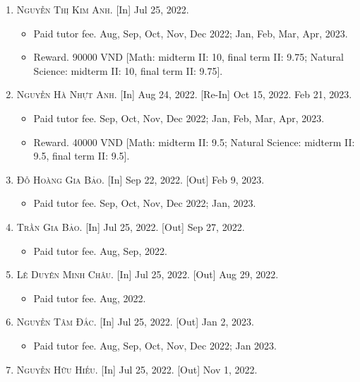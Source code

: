 \documentclass{article}
\begin{document}
\begin{enumerate}
	\item \textsc{Nguyễn Thị Kim Anh.} \textsf{[In]} Jul 25, 2022.
	\begin{itemize}
		\item \textsf{Paid tutor fee.} Aug, Sep, Oct, Nov, Dec 2022; Jan, Feb, Mar, Apr, 2023.
		\item \textsf{Reward.} 90000 VND [Math: midterm II: 10, final term II: 9.75; Natural Science: midterm II: 10, final term II: 9.75].
	\end{itemize}
	\item \textsc{Nguyễn Hà Nhựt Anh.} \textsf{[In]} Aug 24, 2022. \textsf{[Re-In]} Oct 15, 2022. Feb 21, 2023.
	\begin{itemize}
		\item \textsf{Paid tutor fee.} Sep, Oct, Nov, Dec 2022; Jan, Feb, Mar, Apr, 2023.
		\item \textsf{Reward.} 40000 VND [Math: midterm II: 9.5; Natural Science: midterm II: 9.5, final term II: 9.5].
	\end{itemize}
	\item \textsc{Đỗ Hoàng Gia Bảo.} \textsf{[In]} Sep 22, 2022. \textsf{[Out]} Feb 9, 2023.
	\begin{itemize}
		\item \textsf{Paid tutor fee.} Sep, Oct, Nov, Dec 2022; Jan, 2023.
	\end{itemize}
	\item \textsc{Trần Gia Bảo.} \textsf{[In]} Jul 25, 2022. \textsf{[Out]} Sep 27, 2022.
	\begin{itemize}
		\item \textsf{Paid tutor fee.} Aug, Sep, 2022.
	\end{itemize}
	\item \textsc{Lê Duyên Minh Châu.} \textsf{[In]} Jul 25, 2022. \textsf{[Out]} Aug 29, 2022.
	\begin{itemize}
		\item \textsf{Paid tutor fee.} Aug, 2022.
	\end{itemize}
	\item \textsc{Nguyễn Tâm Đắc.} \textsf{[In]} Jul 25, 2022. \textsf{[Out]} Jan 2, 2023.
	\begin{itemize}
		\item \textsf{Paid tutor fee.} Aug, Sep, Oct, Nov, Dec 2022; Jan 2023.
	\end{itemize}
	\item \textsc{Nguyễn Hữu Hiếu.} \textsf{[In]} Jul 25, 2022. \textsf{[Out]} Nov 1, 2022.

\end{enumerate}
\end{document}
